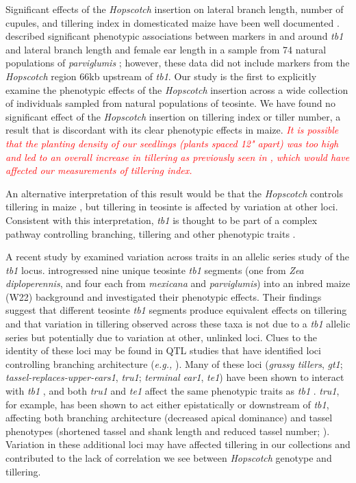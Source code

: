 \documentclass[11pt]{article} %
\newcommand{\track}[1]{\textcolor{red}{\emph{\normalsize #1}} }
\begin{document}
\begin{linenumbers}
\begin{flushleft}
Significant effects of the \emph{Hopscotch} insertion on lateral branch length, number of cupules, and tillering index in domesticated maize have been well documented \citep{Studer2011}. \citet{Weber2007} described significant phenotypic associations between markers in and around \emph{tb1} and lateral branch length and female ear length in a sample from 74 natural populations of \emph{parviglumis} \citep{Weber2007}; however, these data did not include markers from the \emph{Hopscotch} region 66kb upstream of \emph{tb1}. Our study is the first to explicitly examine the phenotypic effects of the \emph{Hopscotch} insertion across a wide collection of individuals sampled from natural populations of teosinte. We have found no significant effect of the \emph{Hopscotch} insertion on tillering index or tiller number, a result that is discordant with its clear phenotypic effects in maize. \track{It is possible that the planting density of our seedlings (plants spaced 12" apart) was too high and led to an overall increase in tillering as previously seen in \citet{LukensDoebley1999}, which would have affected our measurements of tillering index.}

An alternative interpretation of this result would be that the \emph{Hopscotch} controls tillering in maize \citep{Studer2011}, but tillering in teosinte is affected by variation at other loci. Consistent with this interpretation, \emph{tb1} is thought to be part of a complex pathway controlling branching, tillering and other phenotypic traits \citep{KebromBrutnell2007, Clark2006}. 

A recent study by \citet{StuderDoebley2012} examined variation across traits in an allelic series study of the \emph{tb1} locus. \citet{StuderDoebley2012} introgressed nine unique teosinte \emph{tb1} segments (one from \emph{Zea diploperennis}, and four each from \emph{mexicana} and \emph{parviglumis}) into an inbred maize (W22) background and investigated their phenotypic effects. 
Their findings suggest that different teosinte \emph{tb1} segments produce equivalent effects on tillering and that variation in tillering observed across these taxa is not due to a \emph{tb1} allelic series but potentially due to variation at other, unlinked loci. Clues to the identity of these loci may be found in QTL studies that have identified loci controlling branching architecture (\emph{e.g.,} \citealt{DoebleyStec1991, DoebleyStec1993}). Many of these loci (\emph{grassy tillers}, \emph{gt1}; \emph{tassel-replaces-upper-ears1}, \emph{tru1}; \emph{terminal ear1}, \emph{te1}) have been shown to interact with \emph{tb1} \citep{Whipple2011, Li2012},  and both \emph{tru1} and \emph{te1} affect the same phenotypic traits as \emph{tb1} \citep{DoebleyStecGustus1995}. \emph{tru1}, for example, has been shown to act either epistatically or downstream of \emph{tb1}, affecting both branching architecture (decreased apical dominance) and tassel phenotypes (shortened tassel and shank length and reduced tassel number; \citealt{Li2012}). Variation in these additional loci may have affected tillering in our collections and contributed to the lack of correlation we see between \emph{Hopscotch} genotype and tillering. 


\end{flushleft}
\end{linenumbers}
\end{document}
